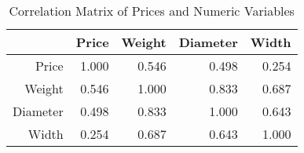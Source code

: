 \begin{table}[ht]
\centering
\begin{tabular}{rrrrr}
  \hline
 & Price & Weight & Diameter & Width \\ 
  \hline
Price & 1.000 & 0.546 & 0.498 & 0.254 \\ 
  Weight & 0.546 & 1.000 & 0.833 & 0.687 \\ 
  Diameter & 0.498 & 0.833 & 1.000 & 0.643 \\ 
  Width & 0.254 & 0.687 & 0.643 & 1.000 \\ 
   \hline
\end{tabular}
\caption{Correlation Matrix of Prices and Numeric Variables} 
\label{tab:correlation_num}
\end{table}
